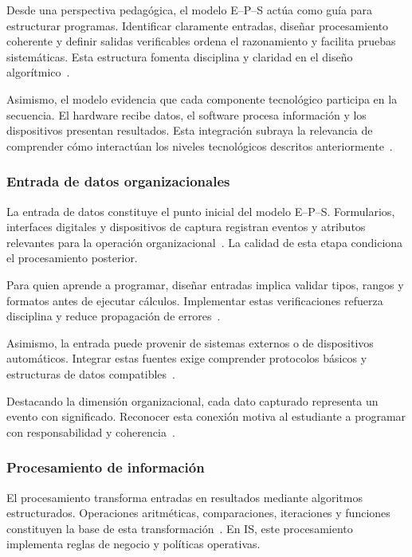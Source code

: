 \documentclass[12pt,twoside]{book}
\begin{document}
					Desde una perspectiva pedagógica, el modelo E–P–S actúa como guía para estructurar programas. Identificar claramente entradas, diseñar procesamiento coherente y definir salidas verificables ordena el razonamiento y facilita pruebas sistemáticas. Esta estructura fomenta disciplina y claridad en el diseño algorítmico~\cite{Hanly2015Problem,Wirth1976Algorithms,Gaddis2022Starting}.
					
					Asimismo, el modelo evidencia que cada componente tecnológico participa en la secuencia. El hardware recibe datos, el software procesa información y los dispositivos presentan resultados. Esta integración subraya la relevancia de comprender cómo interactúan los niveles tecnológicos descritos anteriormente~\cite{Tanenbaum2021Structured,Silberschatz2018Operating,Laudon2020Management}.
					
					\subsubsection{Entrada de datos organizacionales}
						\noindent
						La entrada de datos constituye el punto inicial del modelo E–P–S. Formularios, interfaces digitales y dispositivos de captura registran eventos y atributos relevantes para la operación organizacional~\cite{Laudon2020Management,Kendall2014Systems}. La calidad de esta etapa condiciona el procesamiento posterior.
						
						Para quien aprende a programar, diseñar entradas implica validar tipos, rangos y formatos antes de ejecutar cálculos. Implementar estas verificaciones refuerza disciplina y reduce propagación de errores~\cite{Gaddis2022Starting,Hanly2015Problem,ISO247722024Programming}.
						
						Asimismo, la entrada puede provenir de sistemas externos o de dispositivos automáticos. Integrar estas fuentes exige comprender protocolos básicos y estructuras de datos compatibles~\cite{Silberschatz2018Operating,Tanenbaum2021Structured,Laudon2020Management}.
						
						Destacando la dimensión organizacional, cada dato capturado representa un evento con significado. Reconocer esta conexión motiva al estudiante a programar con responsabilidad y coherencia~\cite{Kendall2014Systems,Ghezzi2003Fundamentals,Leidig2021Competency}.
						
					\subsubsection{Procesamiento de información}
						\noindent
						El procesamiento transforma entradas en resultados mediante algoritmos estructurados. Operaciones aritméticas, comparaciones, iteraciones y funciones constituyen la base de esta transformación~\cite{Wirth1976Algorithms,Hanly2015Problem,Gaddis2022Starting}. En IS, este procesamiento implementa reglas de negocio y políticas operativas.
						
\end{document}
